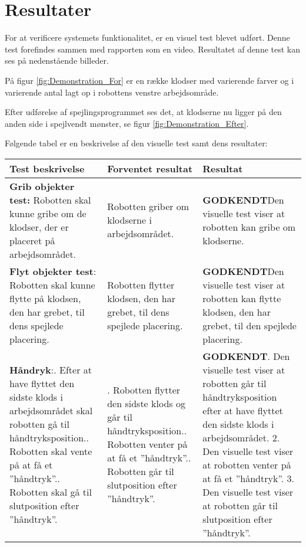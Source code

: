 \chapter{Resultater}\label{chap:Resultater}
For at verificere systemets funktionalitet, er en visuel test blevet udført.
Denne test forefindes sammen med rapporten som en video.
Resultatet af denne test kan ses på nedenstående billeder. 

På figur \ref{fig:Demonstration_For} er en række klodser med varierende farver og i varierende antal lagt op i robottens venstre arbejdsområde.

Efter udførelse af spejlingsprogrammet ses det, at klodserne nu ligger på den anden side i spejlvendt mønster, se figur \ref{fig:Demonstration_Efter}.

Følgende tabel er en beskrivelse af den visuelle test samt dens resultater:
\begin{longtable}{p{4.5cm} | p{4.5cm} | p{4.5cm}}
Test beskrivelse	&	Forventet resultat			&	Resultat	\\
\hline
\textbf{Grib objekter test:}\newline
Robotten skal kunne gribe om de klodser, der er placeret på arbejdsområdet.
& \newline Robotten griber om klodserne i arbejdsområdet.
& \textbf{GODKENDT}\newline Den visuelle test viser at robotten kan gribe om klodserne.\\
\hline
\textbf{Flyt objekter test}:\newline
Robotten skal kunne flytte på klodsen, den har grebet, til dens spejlede placering.
& \newline Robotten flytter klodsen, den har grebet, til dens spejlede placering.
& \textbf{GODKENDT}\newline Den visuelle test viser at robotten kan flytte klodsen, den har grebet, til den spejlede placering.\\
\hline
\textbf{Håndryk}:\newline
1. Efter at have flyttet den sidste klods i arbejdsområdet skal robotten gå til håndtryksposition.\newline
2. Robotten skal vente på at få et ''håndtryk''.\newline
3. Robotten skal gå til slutposition efter ''håndtryk''.
&\newline  1. Robotten flytter den sidste klods og går til håndtryksposition.\newline
2. Robotten venter på at få et ''håndtryk''.\newline
3. Robotten går til slutposition efter ''håndtryk''.
& \textbf{GODKENDT}\newline 
1. Den visuelle test viser at robotten går til håndtryksposition efter at have flyttet den sidste klods i arbejdsområdet.
2. Den visuelle test viser at robotten venter på at få et ''håndtryk''.
3. Den visuelle test viser at robotten går til slutposition efter ''håndtryk''.
\end{longtable}
